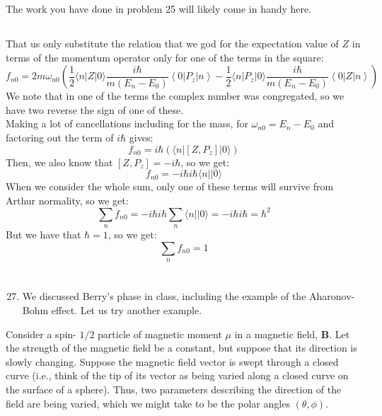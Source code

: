 \documentclass[12pt]{article}
\begin{document}
The work you have done in problem 25 will likely come in handy here.
\subsection{}
That us only substitute the relation that we god for the expectation value of $Z$ in terms of the momentum operator only for one of the terms in the square:
\begin{equation}
  f_{n 0}=2 m \omega_{n 0}\left(\frac{1}{2}\langle n|Z| 0\rangle \frac{i\hbar}{m(E_n-E_0)}\left\langle 0\left|P_{z}\right| n\right\rangle - \frac{1}{2}\langle n|P_{z}| 0\rangle \frac{i\hbar}{m(E_n-E_0)}\left\langle 0\left|Z\right| n\right\rangle\right)
\end{equation}
We note that in one of the terms the complex number was congregated, so we have two reverse the sign of one of these.\\
Making a lot of cancellations including for the mass, for $\omega _{n0}= E_n-E_0$ and factoring out the term of $i\hbar$ gives:
\begin{equation}
  f_{n 0}=i\hbar\left(\langle n|[Z,P_z]| 0\rangle\right)
\end{equation}
Then, we also know that $[Z,P_z]=-i\hbar$, so we get:
\begin{equation}
  f_{n 0}=- i\hbar i\hbar \langle n|| 0\rangle
\end{equation}
When we consider the whole sum, only one of these terms will survive from Arthur normality, so we get:
\begin{equation}
  \sum_{n} f_{n 0}=-i\hbar i\hbar \sum_{n}\langle n|| 0\rangle = -i\hbar i\hbar = \hbar^2
\end{equation}
But we have that $\hbar = 1$, so we get:
\begin{equation}
  \sum_{n} f_{n 0}=1
\end{equation}

\section{}
\begin{enumerate}
  \setcounter{enumi}{26}
  \item We discussed Berry's phase in class, including the example of the Aharonov-Bohm effect. Let us try another example.
\end{enumerate}

Consider a spin- $1 / 2$ particle of magnetic moment $\mu$ in a magnetic field, $\mathbf{B}$. Let the strength of the magnetic field be a constant, but suppose that its direction is slowly changing. Suppose the magnetic field vector is swept through a closed curve (i.e., think of the tip of its vector as being varied along a closed curve on the surface of a sphere). Thus, two parameters describing the direction of the field are being varied, which we might take to be the polar angles $(\theta, \phi)$.
\end{document}
